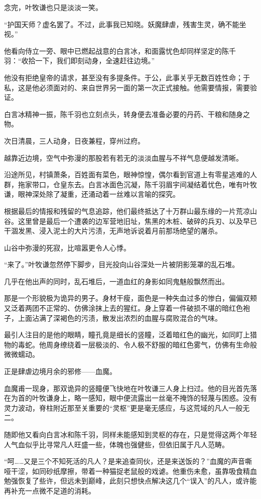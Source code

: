 念完，叶牧谦也只是淡淡一笑。

“护国天师？虚名罢了。不过，此事我已知晓。妖魔肆虐，残害生灵，确不能坐视。”

他看向侍立一旁、眼中已燃起战意的白言冰，和面露忧色却同样坚定的陈千羽：“收拾一下，我们即刻动身，全速赶往边境。”

他没有拒绝皇帝的请求，甚至没有多提条件。于公，此事关乎无数百姓性命；于私，这是他必须面对的、来自世界另一面的第一次正式接触。他需要情报，需要验证。

白言冰精神一振，陈千羽也立刻点头，转身便去准备必要的丹药、干粮和随身之物。

次日清晨，三人动身，日夜兼程，穿州过府。

越靠近边境，空气中弥漫的那股若有若无的淡淡血腥与不祥气息便越发清晰。

沿途所见，村镇萧条，百姓面有菜色，眼神惊惶，偶尔看到官道上有零星逃难的人群，拖家带口，仓皇东去。白言冰面色沉凝，陈千羽眉宇间凝结着忧色，唯有叶牧谦，眼神深处除了凝重，还涌动着一丝难以言喻的探究。

根据最后的情报和残留的气息追踪，他们最终抵达了十万群山最东缘的一片荒凉山谷。这里曾是最后一个遭袭的边军营地旧址，焦黑的木桩、破碎的兵刃、以及早已干涸发黑、浸入泥土的大片污渍，无声地诉说着月前那场绝望的屠杀。

山谷中弥漫的死寂，比喧嚣更令人心悸。

“来了。”叶牧谦忽然停下脚步，目光投向山谷深处一片被阴影笼罩的乱石堆。

几乎在他出声的同时，乱石堆后，一道血红的身影如同鬼魅般飘然而出。

那是一个形貌极为诡异的男子。身材干瘦，面色是一种失血过多的惨白，偏偏双颊又泛着两团不正常的、仿佛涂抹上去的猩红。身上穿着一件破损不堪的暗红色袍子，上面沾满了深褐色的污渍，散发出浓烈的血腥与腐败混合的气味。

最引人注目的是他的眼睛，瞳孔竟是细长的竖瞳，泛着暗红色的幽光，如同盯上猎物的毒蛇。他周身缭绕着一层极淡的、令人极不舒服的暗红色雾气，仿佛有生命般微微蠕动。

正是肆虐边境月余的邪修——血魔。

血魔甫一现身，那双诡异的竖瞳便飞快地在叶牧谦三人身上扫过。他的目光首先落在为首的叶牧谦身上，略一感知，眼中便流露出一丝毫不掩饰的轻蔑与困惑。没有灵力波动，脊柱附近那至关重要的“灵枢”更是毫无感应，与这荒域的凡人一般无二。

随即他又看向白言冰和陈千羽，同样未能感知到灵枢的存在，只是觉得这两个年轻人气血似乎比寻常凡人旺盛一些，体魄也强健些，但依旧属于凡人范畴。

“呵……又是三个不知死活的凡人？是来追查同伙，还是来送饭的？”血魔的声音嘶哑干涩，如同砂纸摩擦，带着一种猫捉老鼠般的戏谑。他重伤未愈，虽靠吸食精血勉强恢复了些许，但远未到巅峰，此刻只想快点解决这几个“误入”的凡人，或许能再补充一点微不足道的消耗。

